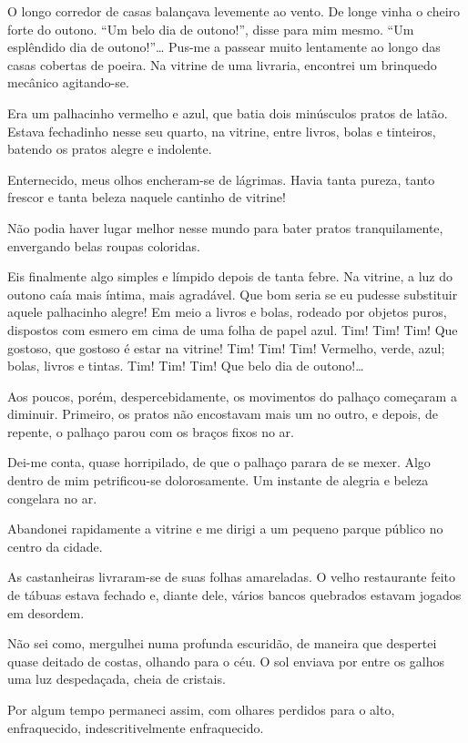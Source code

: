 O longo corredor de casas balançava levemente ao vento. De longe vinha o cheiro forte do outono. ``Um belo dia de outono!'', disse para mim mesmo. ``Um esplêndido dia de outono!''\dots
Pus-me a passear muito lentamente ao longo das casas cobertas de poeira. Na vitrine de uma livraria, encontrei um brinquedo mecânico agitando-se.

Era um palhacinho vermelho e azul, que batia dois minúsculos pratos de latão. Estava fechadinho nesse seu quarto, na vitrine, entre livros, bolas e tinteiros, batendo os pratos alegre e indolente.

Enternecido, meus olhos encheram-se de lágrimas. Havia tanta pureza, tanto frescor e tanta beleza naquele cantinho de vitrine!

Não podia haver lugar melhor nesse mundo para bater pratos tranquilamente, envergando belas roupas coloridas.

Eis finalmente algo simples e límpido depois de tanta febre. Na vitrine, a luz do outono caía mais íntima, mais agradável. Que bom seria se eu pudesse substituir aquele palhacinho alegre! Em meio a livros e bolas, rodeado por objetos puros, dispostos com esmero em cima de uma folha de papel azul. Tim! Tim! Tim! Que gostoso, que gostoso é estar na vitrine! Tim! Tim! Tim! Vermelho, verde, azul; bolas, livros e tintas. Tim! Tim! Tim! Que belo dia de outono!\dots

Aos poucos, porém, despercebidamente, os movimentos do palhaço começaram a diminuir. Primeiro, os pratos não encostavam mais um no outro, e depois, de repente, o palhaço parou com os braços fixos no ar.

Dei-me conta, quase horripilado, de que o palhaço parara de se mexer. Algo dentro de mim petrificou-se dolorosamente. Um instante de alegria e beleza congelara no ar.

Abandonei rapidamente a vitrine e me dirigi a um pequeno parque público no centro da cidade.

As castanheiras livraram-se de suas folhas amareladas. O velho restaurante feito de tábuas estava fechado e, diante dele, vários bancos quebrados estavam jogados em desordem.

Não sei como, mergulhei numa profunda escuridão, de maneira que despertei quase deitado de costas, olhando para o céu. O sol enviava por entre os galhos uma luz despedaçada, cheia de cristais.

Por algum tempo permaneci assim, com olhares perdidos para o alto, enfraquecido, indescritivelmente enfraquecido.

